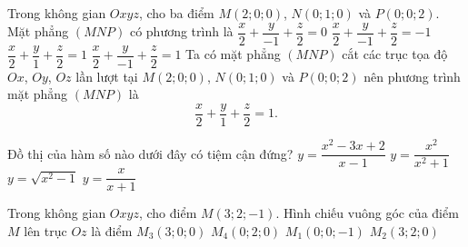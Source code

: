 \begin{ex}%
 Trong không gian $Oxyz$, cho ba điểm $M(2;0;0)$, $N(0;1;0)$ và $P(0;0;2)$. Mặt phẳng $(MNP)$ có phương trình là 
 \choice
  {$\dfrac{x}{2} + \dfrac{y}{-1} + \dfrac{z}{2} = 0$}
  {$\dfrac{x}{2} + \dfrac{y}{-1} + \dfrac{z}{2} = -1$}
  {\True $\dfrac{x}{2} + \dfrac{y}{1} + \dfrac{z}{2} = 1$}
  {$\dfrac{x}{2} + \dfrac{y}{-1}  + \dfrac{z}{2} = 1$}
 \loigiai
  {
  Ta có mặt phẳng $(MNP)$ cắt các trục tọa độ $Ox$, $Oy$, $Oz$ lần lượt tại $M(2;0;0)$, $N(0;1;0)$ và $P(0;0;2)$ nên phương trình mặt phẳng $(MNP)$ là
  $$\dfrac{x}{2} + \dfrac{y}{1} + \dfrac{z}{2} = 1.$$
  }
\end{ex}


\begin{ex}%
	Đồ thị của hàm số nào dưới đây có tiệm cận đứng?
	\choice
	{$y=\dfrac{x^2-3x+2}{x-1}$}
	{$y=\dfrac{x^2}{x^2+1}$}
	{$y=\sqrt{x^2-1}$}
	{\True $y=\dfrac{x}{x+1}$} 
\end{ex}


\begin{ex}%
	Trong không gian $Oxyz$, cho điểm $M\left(3; 2; -1\right)$. Hình chiếu vuông góc của điểm $M$ lên trục $Oz$ là điểm
	\choice
	{$M_3\left(3; 0; 0\right)$}
	{$M_4\left(0; 2; 0\right)$}
	{\True $M_1\left(0; 0; -1\right)$}
	{$M_2\left(3; 2; 0\right)$}
\end{ex}


